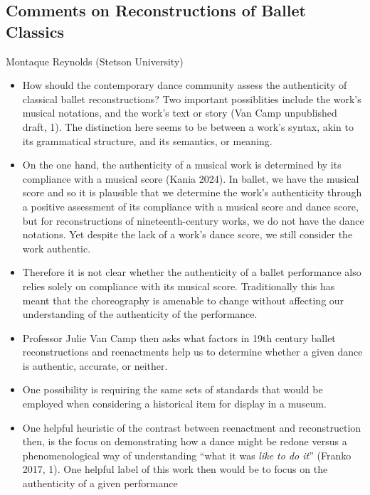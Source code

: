\documentclass[
  letterpaper,
  DIV=11,
  numbers=noendperiod]{scrreprt}
\begin{document}
\begin{tcolorbox}[enhanced jigsaw, arc=.35mm, breakable, rightrule=.15mm, colback=white, colframe=quarto-callout-important-color-frame, bottomrule=.15mm, leftrule=.75mm, opacityback=0, toprule=.15mm, left=2mm]
\begin{tcolorbox}[enhanced jigsaw, arc=.35mm, breakable, rightrule=.15mm, colback=white, colframe=quarto-callout-tip-color-frame, bottomrule=.15mm, leftrule=.75mm, opacityback=0, toprule=.15mm, left=2mm]
\chapter{Comments on Reconstructions of Ballet
Classics}\label{comments-on-reconstructions-of-ballet-classics}

Montaque Reynolds (Stetson University)

\hfill\break

\begin{itemize}
\item
  How should the contemporary dance community assess the authenticity of
  classical ballet reconstructions? Two important possiblities include
  the work's musical notations, and the work's text or story (Van Camp
  unpublished draft, 1). The distinction here seems to be between a
  work's syntax, akin to its grammatical structure, and its semantics,
  or meaning.
\item
  On the one hand, the authenticity of a musical work is determined by
  its compliance with a musical score (Kania 2024). In ballet, we have
  the musical score and so it is plausible that we determine the work's
  authenticity through a positive assessment of its compliance with a
  musical score and dance score, but for reconstructions of
  nineteenth-century works, we do not have the dance notations. Yet
  despite the lack of a work's dance score, we still consider the work
  authentic.
\item
  Therefore it is not clear whether the authenticity of a ballet
  performance also relies solely on compliance with its musical score.
  Traditionally this has meant that the choreography is amenable to
  change without affecting our understanding of the authenticity of the
  performance.
\item
  Professor Julie Van Camp then asks what factors in 19th century ballet
  reconstructions and reenactments help us to determine whether a given
  dance is authentic, accurate, or neither.
\item
  One possibility is requiring the same sets of standards that would be
  employed when considering a historical item for display in a museum.
\item
  One helpful heuristic of the contrast between reenactment and
  reconstruction then, is the focus on demonstrating how a dance might
  be redone versus a phenomenological way of understanding ``what it was
  \emph{like to do it}'' (Franko 2017, 1). One helpful label of this
  work then would be to focus on the authenticity of a given performance

\end{itemize}
\end{tcolorbox}
\end{tcolorbox}
\end{document}
